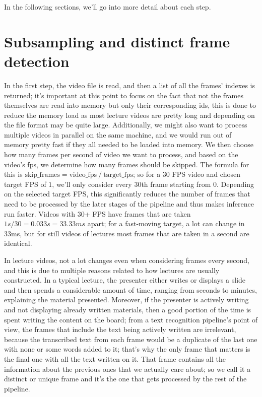 In the following sections, we'll go into more detail about each step.

\section{Subsampling and distinct frame detection}

In the first step, the video file is read, and then a list of all the frames' indexes is returned; it's important at this point to focus on the fact that not the frames themselves are read into memory but only their corresponding ids, this is done to reduce the memory load as most lecture videos are pretty long and depending on the file format may be quite large. Additionally, we might also want to process multiple videos in parallel on the same machine, and we would run out of memory pretty fast if they all needed to be loaded into memory. We then choose how many frames per second of video we want to process, and based on the video's \gls{fps}, we determine how many frames should be skipped. The formula for this is  $\text{skip\_frames} = \text{video\_fps} \ / \ \text{target\_fps}$; so for a $30$ FPS video and chosen target FPS of $1$, we'll only consider every $30$th frame starting from $0$. Depending on the selected target FPS, this significantly reduces the number of frames that need to be processed by the later stages of the pipeline and thus makes inference run faster. Videos with 30+ FPS have frames that are taken $1s / 30 = 0.033s  = 33.33ms$ apart; for a fast-moving target, a lot can change in 33ms, but for still videos of lectures most frames that are taken in a second are identical.

In lecture videos, not a lot changes even when considering frames every second, and this is due to multiple reasons related to how lectures are usually constructed. In a typical lecture, the presenter either writes or displays a slide and then spends a considerable amount of time, ranging from seconds to minutes, explaining the material presented. Moreover, if the presenter is actively writing and not displaying already written materials, then a good portion of the time is spent writing the content on the board; from a text recognition pipeline's point of view, the frames that include the text being actively written are irrelevant, because the transcribed text from each frame would be a duplicate of the last one with none or some words added to it; that's why the only frame that matters is the final one with all the text written on it. That frame contains all the information about the previous ones that we actually care about; so we call it a distinct or unique frame and it's the one that gets processed by the rest of the pipeline.

